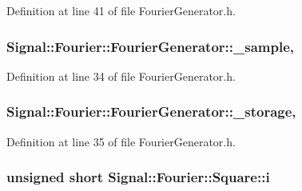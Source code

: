 Definition at line 41 of file Fourier\+Generator.\+h.

\hypertarget{classSignal_1_1Fourier_1_1FourierGenerator_ad720bf2b268dc621ace64c54c0816597}{
\subsubsection[{\+\_\+sample}]{ Signal\+::\+Fourier\+::\+Fourier\+Generator\+::\+\_\+sample\hspace{0.3cm}{\ttfamily [protected]}, {\ttfamily [inherited]}}}\label{classSignal_1_1Fourier_1_1FourierGenerator_ad720bf2b268dc621ace64c54c0816597}


Definition at line 34 of file Fourier\+Generator.\+h.

\hypertarget{classSignal_1_1Fourier_1_1FourierGenerator_ab6e6b79cf56e31c9a1b5766f357f8cfb}{
\subsubsection[{\+\_\+storage}]{ Signal\+::\+Fourier\+::\+Fourier\+Generator\+::\+\_\+storage\hspace{0.3cm}{\ttfamily [protected]}, {\ttfamily [inherited]}}}\label{classSignal_1_1Fourier_1_1FourierGenerator_ab6e6b79cf56e31c9a1b5766f357f8cfb}


Definition at line 35 of file Fourier\+Generator.\+h.

\hypertarget{classSignal_1_1Fourier_1_1Square_a942768cca477bd9bfc71f9a3ea1be8e5}{
\subsubsection[{i}]{\setlength{\rightskip}{0pt plus 5cm}unsigned short Signal\+::\+Fourier\+::\+Square\+::i\hspace{0.3cm}{\ttfamily [protected]}}}\label{classSignal_1_1Fourier_1_1Square_a942768cca477bd9bfc71f9a3ea1be8e5}


